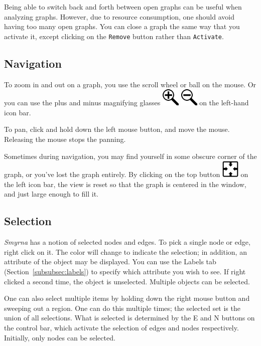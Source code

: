 Being able to switch back and forth between open graphs can be
useful when analyzing graphs. However, due to resource consumption,
one should avoid having too many open graphs. You can close a
graph the same way that you activate it, except clicking on the
{\tt Remove} button rather than {\tt Activate}. 

\subsection{Navigation}
To zoom in and out on a graph, you use the scroll wheel or ball
on the mouse. Or you can use the plus and minus magnifying glasses
\includegraphics{figures/zoomin.png} \includegraphics{figures/zoomout.png}
on the left-hand icon bar.

To pan, click and hold down the left mouse button, and move the
mouse. Releasing the mouse stops the panning.

Sometimes during navigation, you may find yourself in some obscure corner
of the graph, or you've lost the graph entirely. By clicking on the top
button
\includegraphics{figures/center.png}
on the left icon bar, the view is reset so that the graph is 
centered in the window, and just large enough
to fill it. 

\subsection{Selection}
{\it Smyrna} has a notion of selected nodes and edges. 
To pick a single node or edge, right click on it. The color will
change to indicate the selection; in addition, an
attribute of the object may be displayed. You can use the Labels
tab (Section~\ref{subsubsec:labels}) to specify which attribute you wish to see.
If right clicked a second time, the object is unselected.
Multiple objects can be selected.

One can also select multiple items by holding down the right mouse
button and sweeping out a region. One can do this multiple times;
the selected set is the union of all selections.
What is selected is determined by the E and N buttons on the control bar, which
activate the selection of edges and nodes respectively. Initially, only nodes
can be selected.

